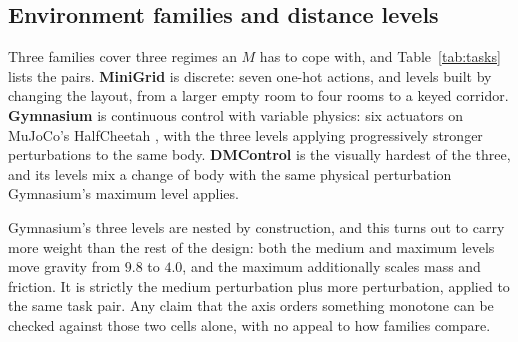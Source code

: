 \subsection{Environment families and distance levels}
\label{sec:method:families}

\begin{table}[t]
  \centering
  \footnotesize
  \setlength{\tabcolsep}{3pt}
  
  \caption{The nine cells, read from the stored results rather than from the
  configuration files. $d_{\mathrm{param}}$ is left empty where differencing a
  physics vector would misdescribe the pair (Section~\ref{sec:method:distances});
  $d_{\mathrm{trans}}$ is the median over the cell's seeds and is comparable
  within a family, not across families.}
  \label{tab:tasks}
\end{table}

Three families cover three regimes an $M$ has to cope with, and
Table~\ref{tab:tasks} lists the pairs. \textbf{MiniGrid}
\citep{chevalierboisvert2023minigrid} is discrete: seven one-hot actions, and
levels built by changing the layout, from a larger empty room to four rooms to a
keyed corridor. \textbf{Gymnasium} is continuous control with variable physics:
six actuators on MuJoCo's HalfCheetah \citep{todorov2012mujoco}, with the three
levels applying progressively stronger perturbations to the same body.
\textbf{DMControl} \citep{tunyasuvunakool2020dmcontrol} is the visually hardest
of the three, and its levels mix a change of body with the same physical
perturbation Gymnasium's maximum level applies.

Gymnasium's three levels are nested by construction, and this turns out to carry
more weight than the rest of the design: both the medium and maximum levels move
gravity from $9.8$ to $4.0$, and the maximum additionally scales mass and
friction. It is strictly the medium perturbation plus more perturbation, applied
to the same task pair. Any claim that the axis orders something monotone can be
checked against those two cells alone, with no appeal to how families compare.

